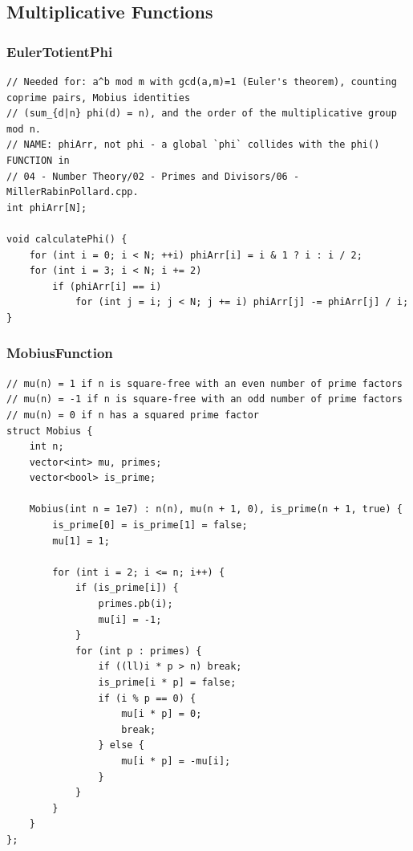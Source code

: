 \documentclass[9pt,a4paper,twocolumn]{extarticle}
\begin{document}
\subsection{Multiplicative Functions}

\filbreak
\subsubsection{EulerTotientPhi}
\nopagebreak
\begin{lstlisting}
// Needed for: a^b mod m with gcd(a,m)=1 (Euler's theorem), counting coprime pairs, Mobius identities
// (sum_{d|n} phi(d) = n), and the order of the multiplicative group mod n.
// NAME: phiArr, not phi - a global `phi` collides with the phi() FUNCTION in
// 04 - Number Theory/02 - Primes and Divisors/06 - MillerRabinPollard.cpp.
int phiArr[N];

void calculatePhi() {
    for (int i = 0; i < N; ++i) phiArr[i] = i & 1 ? i : i / 2;
    for (int i = 3; i < N; i += 2)
        if (phiArr[i] == i)
            for (int j = i; j < N; j += i) phiArr[j] -= phiArr[j] / i;
}
\end{lstlisting}

\filbreak
\subsubsection{MobiusFunction}
\nopagebreak
\begin{lstlisting}
// mu(n) = 1 if n is square-free with an even number of prime factors
// mu(n) = -1 if n is square-free with an odd number of prime factors
// mu(n) = 0 if n has a squared prime factor
struct Mobius {
    int n;
    vector<int> mu, primes;
    vector<bool> is_prime;

    Mobius(int n = 1e7) : n(n), mu(n + 1, 0), is_prime(n + 1, true) {
        is_prime[0] = is_prime[1] = false;
        mu[1] = 1;

        for (int i = 2; i <= n; i++) {
            if (is_prime[i]) {
                primes.pb(i);
                mu[i] = -1;
            }
            for (int p : primes) {
                if ((ll)i * p > n) break;
                is_prime[i * p] = false;
                if (i % p == 0) {
                    mu[i * p] = 0;
                    break;
                } else {
                    mu[i * p] = -mu[i];
                }
            }
        }
    }
};
\end{lstlisting}
\end{document}
